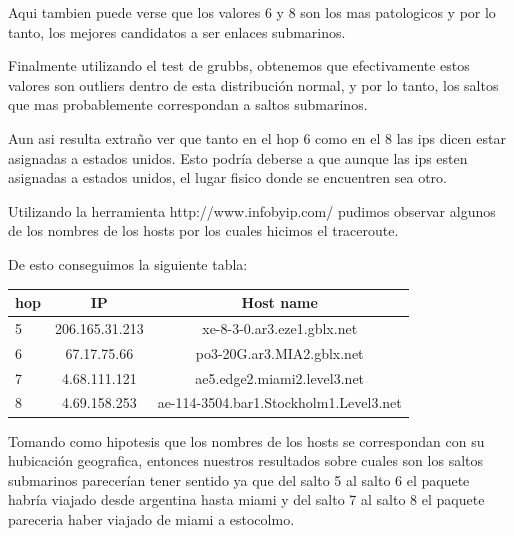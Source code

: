 Aqui tambien puede verse que los valores 6 y 8 son los mas patologicos y por lo tanto, los mejores candidatos a ser enlaces submarinos.

Finalmente utilizando el test de grubbs, obtenemos que efectivamente estos valores son outliers dentro de esta distribución normal, y por lo tanto, los saltos que mas probablemente correspondan a saltos submarinos.

Aun asi resulta extraño ver que tanto en el hop 6 como en el 8 las ips dicen estar asignadas a estados unidos. Esto podría deberse a que aunque las ips esten asignadas a estados unidos, el lugar fisico donde se encuentren sea otro.

Utilizando la herramienta http://www.infobyip.com/ pudimos observar algunos de los nombres de los hosts por los cuales hicimos el traceroute.

De esto conseguimos la siguiente tabla:

\begin{tabular}{| l | c | c }
\hline 
hop & IP & Host name\\
\hline 
5  &  206.165.31.213  &  xe-8-3-0.ar3.eze1.gblx.net\\
\hline 
6  &  67.17.75.66  &   po3-20G.ar3.MIA2.gblx.net\\
\hline 
7  &  4.68.111.121  & ae5.edge2.miami2.level3.net\\
\hline 
8  &  4.69.158.253  & ae-114-3504.bar1.Stockholm1.Level3.net\\
\end{tabular}

Tomando como hipotesis que los nombres de los hosts se correspondan con su hubicación geografica, entonces nuestros resultados sobre 
cuales son los saltos submarinos parecerían tener sentido ya que del salto 5 al salto 6 el paquete habría viajado desde argentina hasta miami y 
del salto 7 al salto 8 el paquete pareceria haber viajado de miami a estocolmo.